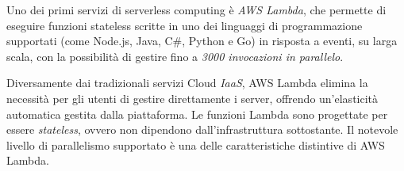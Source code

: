 Uno dei primi servizi di serverless computing è \textit{AWS Lambda}, che permette di eseguire funzioni stateless scritte in uno dei linguaggi di programmazione supportati (come Node.js, Java, C\#, Python e Go) in risposta a eventi, su larga scala, con la possibilità di gestire fino a \textit{3000 invocazioni in parallelo}. 

Diversamente dai tradizionali servizi Cloud \textit{IaaS}, AWS Lambda elimina la necessità per gli utenti di gestire direttamente i server, offrendo un'elasticità automatica gestita dalla piattaforma. Le funzioni Lambda sono progettate per essere \textit{stateless}, ovvero non dipendono dall'infrastruttura sottostante. Il notevole livello di parallelismo supportato è una delle caratteristiche distintive di AWS Lambda.